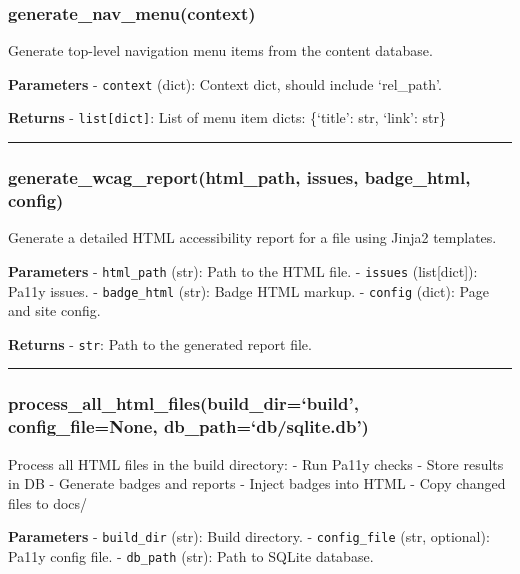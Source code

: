 \subsubsection{generate\_nav\_menu(context)}\label{generate_nav_menucontext}

Generate top-level navigation menu items from the content database.

\textbf{Parameters} - \texttt{context} (dict): Context dict, should
include `rel\_path'.

\textbf{Returns} - \texttt{list{[}dict{]}}: List of menu item dicts:
\{`title': str, `link': str\}

\begin{center}\rule{0.5\linewidth}{0.5pt}\end{center}

\subsubsection{generate\_wcag\_report(html\_path, issues, badge\_html,
config)}\label{generate_wcag_reporthtml_path-issues-badge_html-config}

Generate a detailed HTML accessibility report for a file using Jinja2
templates.

\textbf{Parameters} - \texttt{html\_path} (str): Path to the HTML file.
- \texttt{issues} (list{[}dict{]}): Pa11y issues. - \texttt{badge\_html}
(str): Badge HTML markup. - \texttt{config} (dict): Page and site
config.

\textbf{Returns} - \texttt{str}: Path to the generated report file.

\begin{center}\rule{0.5\linewidth}{0.5pt}\end{center}

\subsubsection{process\_all\_html\_files(build\_dir=`build',
config\_file=None,
db\_path=`db/sqlite.db')}\label{process_all_html_filesbuild_dirbuild-config_filenone-db_pathdbsqlite.db}

Process all HTML files in the build directory: - Run Pa11y checks -
Store results in DB - Generate badges and reports - Inject badges into
HTML - Copy changed files to docs/

\textbf{Parameters} - \texttt{build\_dir} (str): Build directory. -
\texttt{config\_file} (str, optional): Pa11y config file. -
\texttt{db\_path} (str): Path to SQLite database.

